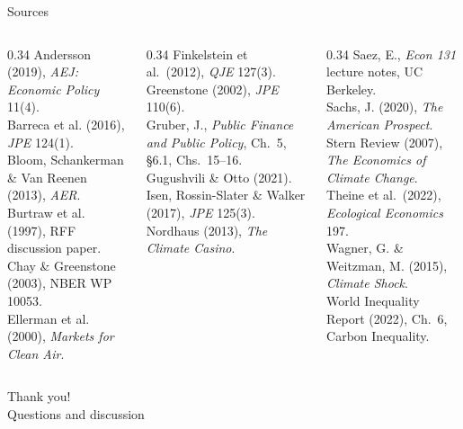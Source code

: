 \documentclass[11pt,aspectratio=169]{beamer}
\begin{document}
\begin{frame}{Sources}
  \tiny
  \begin{columns}[T]
    \begin{column}{0.34\textwidth}
      Andersson (2019), \emph{AEJ: Economic Policy} 11(4).\\
      Barreca et al. (2016), \emph{JPE} 124(1).\\
      Bloom, Schankerman \& Van Reenen (2013), \emph{AER}.\\
      Burtraw et al. (1997), RFF discussion paper.\\
      Chay \& Greenstone (2003), NBER WP 10053.\\
      Ellerman et al. (2000), \emph{Markets for Clean Air}.
    \end{column}
    \begin{column}{0.34\textwidth}
      Finkelstein et al.\ (2012), \emph{QJE} 127(3).\\
      Greenstone (2002), \emph{JPE} 110(6).\\
      Gruber, J., \emph{Public Finance and Public Policy}, Ch.\ 5, \S6.1, Chs.\ 15--16.\\
      Gugushvili \& Otto (2021).\\
      Isen, Rossin-Slater \& Walker (2017), \emph{JPE} 125(3).\\
      Nordhaus (2013), \emph{The Climate Casino}.
    \end{column}
    \begin{column}{0.34\textwidth}
      Saez, E., \emph{Econ 131} lecture notes, UC Berkeley.\\
      Sachs, J. (2020), \emph{The American Prospect}.\\
      Stern Review (2007), \emph{The Economics of Climate Change}.\\
      Theine et al.\ (2022), \emph{Ecological Economics} 197.\\
      Wagner, G. \& Weitzman, M. (2015), \emph{Climate Shock}.\\
      World Inequality Report (2022), Ch.\ 6, Carbon Inequality.
    \end{column}
  \end{columns}
\end{frame}

\begin{frame}[standout]
  Thank you!\\
  \vspace{0.5em}
  \small Questions and discussion
\end{frame}
\end{document}
